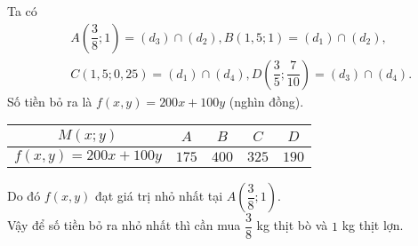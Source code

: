 \begin{baitap}
{\begin{center}
		\end{center}
		Ta có 
		{\allowdisplaybreaks
			\begin{eqnarray*}
				&&A\left(\dfrac{3}{8};1\right)=(d_3) \cap (d_2), B(1{,}5;1)=(d_1) \cap (d_2),\\
				&&C(1{,}5;0{,}25)=(d_1) \cap (d_4), D\left(\dfrac{3}{5};\dfrac{7}{10}\right)=(d_3) \cap (d_4).
			\end{eqnarray*}
		}
		Số tiền bỏ ra là $f(x,y)=200x+100y$ (nghìn đồng).
		\begin{center}
			\renewcommand\arraystretch{1.6}
			\renewcommand{\tabcolsep}{6mm}
			\begin{tabular}{|c|c|c|c|c|}
				\hline 
				$M(x;y)$& $A$ & $B$ & $C$ & $D$ \\ 
				\hline 
				$f(x,y)=200x+100y$& $175$ & $400$ & $325$ & $190$ \\ 
				\hline 
			\end{tabular} 
		\end{center}
		Do đó $f(x,y)$ đạt giá trị nhỏ nhất tại $A\left(\dfrac{3}{8};1\right)$.\\
		Vậy để số tiền bỏ ra nhỏ nhất thì cần mua $\dfrac{3}{8}$ kg thịt bò và $1$ kg thịt lợn.
	}
\end{baitap}